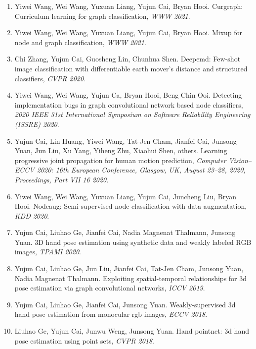 \begin{enumerate}
\item Yiwei Wang, Wei Wang, Yuxuan Liang, Yujun Cai, Bryan Hooi. Curgraph: Curriculum learning for graph classification, \textit{WWW 2021}.

\item Yiwei Wang, Wei Wang, Yuxuan Liang, Yujun Cai, Bryan Hooi. Mixup for node and graph classification, \textit{WWW 2021}.

\item Chi Zhang, Yujun Cai, Guosheng Lin, Chunhua Shen. Deepemd: Few-shot image classification with differentiable earth mover's distance and structured classifiers, \textit{CVPR 2020}.

\item Yiwei Wang, Wei Wang, Yujun Ca, Bryan Hooi, Beng Chin Ooi. Detecting implementation bugs in graph convolutional network based node classifiers, \textit{2020 IEEE 31st International Symposium on Software Reliability Engineering (ISSRE) 2020}.

\item Yujun Cai, Lin Huang, Yiwei Wang, Tat-Jen Cham, Jianfei Cai, Junsong Yuan, Jun Liu, Xu Yang, Yiheng Zhu, Xiaohui Shen, others. Learning progressive joint propagation for human motion prediction, \textit{Computer Vision--ECCV 2020: 16th European Conference, Glasgow, UK, August 23--28, 2020, Proceedings, Part VII 16 2020}.

\item Yiwei Wang, Wei Wang, Yuxuan Liang, Yujun Cai, Juncheng Liu, Bryan Hooi. Nodeaug: Semi-supervised node classification with data augmentation, \textit{KDD 2020}.

\item Yujun Cai, Liuhao Ge, Jianfei Cai, Nadia Magnenat Thalmann, Junsong Yuan. 3D hand pose estimation using synthetic data and weakly labeled RGB images, \textit{TPAMI 2020}.

\item Yujun Cai, Liuhao Ge, Jun Liu, Jianfei Cai, Tat-Jen Cham, Junsong Yuan, Nadia Magnenat Thalmann. Exploiting spatial-temporal relationships for 3d pose estimation via graph convolutional networks, \textit{ICCV 2019}.

\item Yujun Cai, Liuhao Ge, Jianfei Cai, Junsong Yuan. Weakly-supervised 3d hand pose estimation from monocular rgb images, \textit{ECCV 2018}.

\item Liuhao Ge, Yujun Cai, Junwu Weng, Junsong Yuan. Hand pointnet: 3d hand pose estimation using point sets, \textit{CVPR 2018}.
\end{enumerate}